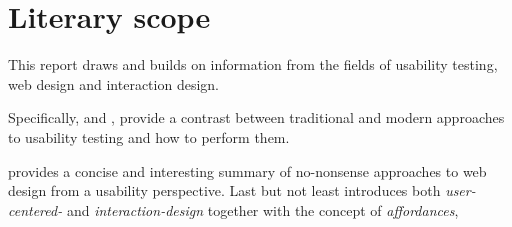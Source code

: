 \section{Literary scope}

  This report draws and builds on information from the fields of usability
  testing, web design and interaction design.

  Specifically,  and
  , provide a contrast between
  traditional and modern approaches to usability testing and how to perform
  them.

   provides a concise and interesting
  summary of no-nonsense approaches to web design from a usability perspective.
  Last but not least  introduces
  both \textit{user-centered-} and \textit{interaction-design} together
  with the concept of \textit{affordances},

